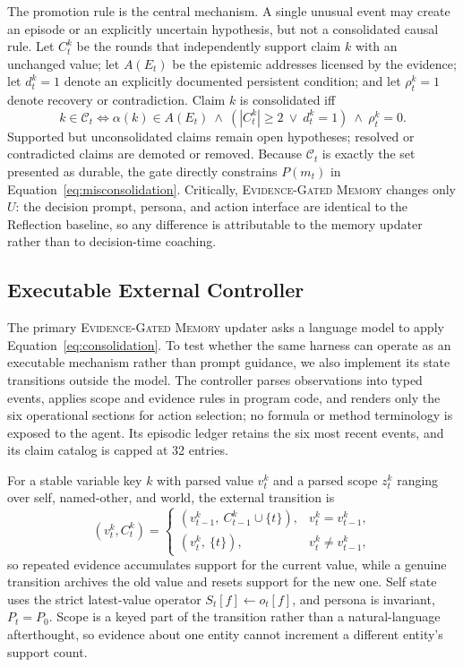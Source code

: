 \documentclass[sigconf,anonymous]{acmart}
\newcommand{\egm}{\textsc{Evidence-Gated Memory}}
\begin{document}
The promotion rule is the central mechanism. A single unusual event may create
an episode or an explicitly uncertain hypothesis, but not a consolidated causal
rule. Let $C_t^k$ be the rounds that independently support claim $k$ with an
unchanged value; let $A(E_t)$ be the epistemic addresses licensed by the
evidence; let $d_t^k=1$ denote an explicitly documented persistent condition;
and let $\rho_t^k=1$ denote recovery or contradiction. Claim $k$ is consolidated
iff
\begin{equation}
  k\in\mathcal{C}_t \iff
  \alpha(k)\in A(E_t)\ \land\
  (|C_t^k|\ge2\ \lor\ d_t^k=1)\ \land\ \rho_t^k=0 .
  \label{eq:consolidation}
\end{equation}
Supported but unconsolidated claims remain open hypotheses; resolved or
contradicted claims are demoted or removed. Because $\mathcal{C}_t$ is exactly
the set presented as durable, the gate directly constrains $P(m_t)$ in
Equation~\ref{eq:misconsolidation}.
Critically, \egm{} changes only $U$: the decision prompt, persona, and action
interface are identical to the Reflection baseline, so any difference is
attributable to the memory updater rather than to decision-time coaching.

\subsection{Executable External Controller}
\label{sec:controller}

The primary \egm{} updater asks a language model to apply
Equation~\ref{eq:consolidation}. To test whether the same harness can operate as
an executable mechanism rather than prompt guidance, we also implement its state
transitions outside the model. The controller parses observations into typed
events, applies scope and evidence rules in program code, and renders only the
six operational sections for action selection; no formula or method terminology
is exposed to the agent. Its episodic ledger retains the six most recent events,
and its claim catalog is capped at 32 entries.

For a stable variable key $k$ with parsed value $v_t^k$ and a parsed scope
$z_t^k$ ranging over self, named-other, and world, the external
transition is
\begin{equation}
  (v_t^k, C_t^k)=
  \begin{cases}
    (v_{t-1}^k,\ C_{t-1}^k\cup\{t\}), & v_t^k=v_{t-1}^k,\\[2pt]
    (v_t^k,\ \{t\}), & v_t^k\neq v_{t-1}^k,
  \end{cases}
  \label{eq:transition}
\end{equation}
so repeated evidence accumulates support for the current value, while a genuine
transition archives the old value and resets support for the new one. Self state
uses the strict latest-value operator $S_t[f]\leftarrow o_t[f]$, and persona is
invariant, $P_t=P_0$. Scope is a keyed part of the transition rather than a
natural-language afterthought, so evidence about one entity cannot increment a
different entity's support count.
\end{document}
